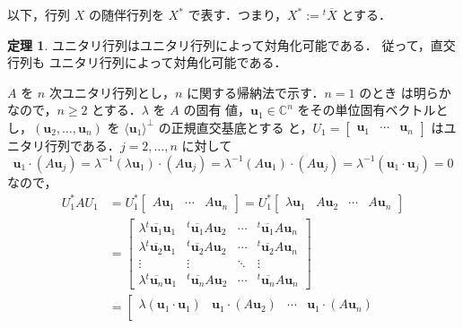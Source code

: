 \documentclass[11pt, uplatex, dvipdfmx, titlepage]{jsarticle}
\makeatletter
\renewcommand{\bar}[1]{\overline{#1}}
\renewenvironment{proof}[1][\proofname]{\par
  \pushQED{\qed}%
  \normalfont \topsep6\p@\@plus6\p@\relax
  \trivlist
  \item[\hskip\labelsep
         \bfseries
    {#1}]\ignorespaces
}{%
  \popQED\endtrivlist\@endpefalse
}
\theoremstyle{definition}
\newtheorem{theorem}{定理}[section]
\renewcommand{\proofname}{\textbf{証明}}
\makeatother
\begin{document}
以下，行列 $X$ の随伴行列を $X^*$ で表す．つまり，$X^* := {}^{t}\bar{X}$ とする．

\begin{theorem}\label{thm:diag-by-unitary}
  ユニタリ行列はユニタリ行列によって対角化可能である． 従って，直交行列も
  ユニタリ行列によって対角化可能である．
\end{theorem}

\begin{proof}
  $A$ を $n$ 次ユニタリ行列とし，$n$ に関する帰納法で示す．$n=1$ のとき
  は明らかなので，$n \geq 2$ とする．$\lambda$ を $A$ の固有
  値，$\bm{u}_1 \in \mathbb{C}^n$ をその単位固有ベクトルと
  し，$(\bm{u}_2, \ldots, \bm{u}_n)$
  を $\langle \bm{u}_1 \rangle ^{\perp}$ の正規直交基底とする
  と，$U_1=\left[
    \begin{array}{ccc}
      \bm{u}_1 & \cdots & \bm{u}_n
    \end{array}
  \right]$ はユニタリ行列である．$j=2, \ldots, n$ に対して
  \[
    \bm{u}_1\cdot ( A \bm{u}_j) = \lambda^{-1} (\lambda \bm{u}_1) \cdot
   ( A\bm{u}_j) = \lambda^{-1} (A\bm{u}_1) \cdot ( A\bm{u}_j) =
    \lambda^{-1}(\bm{u}_1 \cdot  \bm{u}_j) =0
  \]
  なので，
  \[
    \begin{aligned}
      U_1^*A U_1 &= U_1^*\left[
        \begin{array}{ccc}
          A \bm{u}_1 & \cdots & A\bm{u}_n
        \end{array}
      \right] = U_1^* \left[
        \begin{array}{cccc}
          \lambda \bm{u}_1 & A \bm{u}_2 & \cdots & A\bm{u}_n
        \end{array}
      \right]\\
      &= \left[
        \begin{array}{cccc}
          \lambda {}^{t}\bar{\bm{u}_1}\bm{u}_1 & {}^{t}\bar{\bm{u}_1} A \bm{u}_2 & \cdots & {}^{t}\bar{\bm{u}_1} A \bm{u}_n\\
          \lambda {}^{t}\bar{\bm{u}_2} \bm{u}_1 & {}^{t} \bar{\bm{u}_2} A\bm{u}_2 & \cdots & {}^{t}\bar{\bm{u}_2 }A \bm{u}_n\\
          \vdots & \vdots & \ddots & \vdots\\
          \lambda {}^{t} \bar{\bm{u}_n} \bm{u}_1 & {}^{t} \bar{\bm{u}_n} A\bm{u}_2 & \cdots & {}^{t}\bar{\bm{u}_n} A \bm{u}_n
        \end{array}
      \right]\\
      &= \left[
        \begin{array}{cccc}
          \lambda (\bm{u}_1\cdot \bm{u}_1) & \bm{u}_1\cdot ( A\bm{u}_2) & \cdots & \bm{u}_1\cdot  (A\bm{u}_n)\\

\end{array}
\end{aligned}\]
\end{proof}
\end{document}
